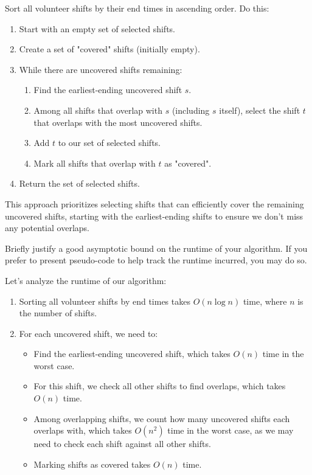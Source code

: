 \documentclass[11pt,fleqn]{exam}
\newenvironment{soln}{\color{solnblue}}{}
\newif\ifsolutions\solutionsfalse
\begin{document}
\begin{questions}
\begin{soln}
    Sort all volunteer shifts by their end times in ascending order. Do this:
    \begin{enumerate}
        \item Start with an empty set of selected shifts.
        \item Create a set of "covered" shifts (initially empty).
        \item While there are uncovered shifts remaining:
            \begin{enumerate}
                \item Find the earliest-ending uncovered shift $s$.
                \item Among all shifts that overlap with $s$ (including $s$ itself), select the shift $t$ that overlaps with the most uncovered shifts.
                \item Add $t$ to our set of selected shifts.
                \item Mark all shifts that overlap with $t$ as "covered".
            \end{enumerate}
        \item Return the set of selected shifts.
    \end{enumerate}
    
    This approach prioritizes selecting shifts that can efficiently cover the remaining uncovered shifts, starting with the earliest-ending shifts to ensure we don't miss any potential overlaps.
\end{soln}

\ifsolutions\fi 

\question[4] Briefly justify a good asymptotic bound on the runtime of your algorithm. If you prefer to present pseudo-code to help track the runtime incurred, you may do so.

\begin{soln}
    Let's analyze the runtime of our algorithm:
    
    \begin{enumerate}
        \item Sorting all volunteer shifts by end times takes $O(n \log n)$ time, where $n$ is the number of shifts.
        
        \item For each uncovered shift, we need to:
        \begin{itemize}
            \item Find the earliest-ending uncovered shift, which takes $O(n)$ time in the worst case.
            \item For this shift, we check all other shifts to find overlaps, which takes $O(n)$ time.
            \item Among overlapping shifts, we count how many uncovered shifts each overlaps with, which takes $O(n^2)$ time in the worst case, as we may need to check each shift against all other shifts.
            \item Marking shifts as covered takes $O(n)$ time.
        \end{itemize}
        

\end{enumerate}
\end{soln}
\end{questions}
\end{document}
